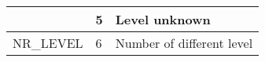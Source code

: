 \documentclass{template/openetcs_article}
\begin{document}
\begin{longtable}{|l|l|l|}
	&	\begin{minipage}[t]{0.10\linewidth} 5 \end{minipage} 
	&	\begin{minipage}[t]{0.50\linewidth} Level unknown \end{minipage}\\
	\hline
		\begin{minipage}[t]{0.45\linewidth} NR\_LEVEL \end{minipage} 
	&	\begin{minipage}[t]{0.10\linewidth} 6 \end{minipage} 
	&	\begin{minipage}[t]{0.50\linewidth} Number of different level \end{minipage}\\
	\hline
\end{longtable}
\end{document}
